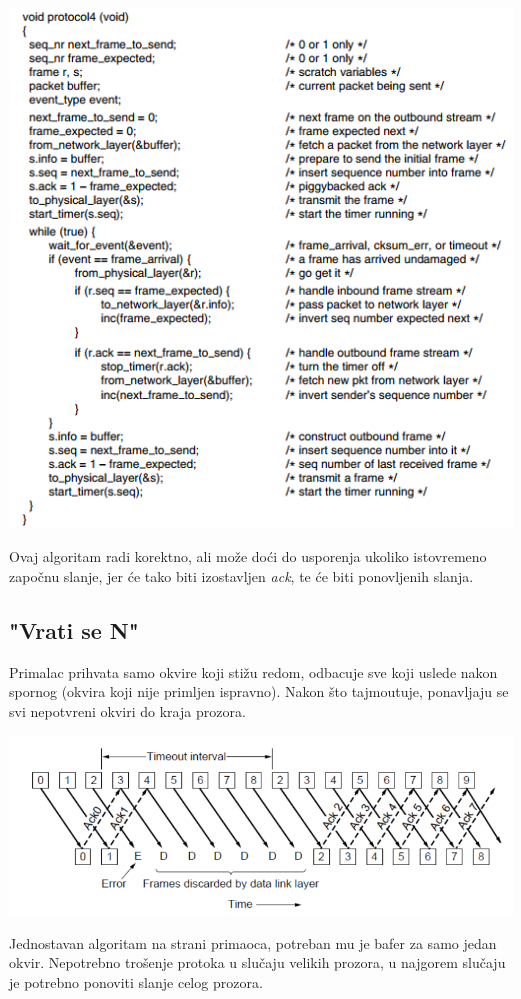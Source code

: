 \documentclass{article} %
\begin{document}
\begin{center}
\includegraphics[scale=0.7]{1-bitni-kod}
\end{center}
Ovaj algoritam radi korektno, ali mo\v{z}e do\'{c}i do usporenja ukoliko istovremeno zapo\v{c}nu slanje, jer \'{c}e tako biti izostavljen \textit{ack}, te \'{c}e biti ponovljenih slanja.

\subsection{"Vrati se N"}

Primalac prihvata samo okvire koji sti\v{z}u redom, odbacuje sve koji uslede nakon spornog (okvira koji nije primljen ispravno). Nakon \v{s}to tajmoutuje, ponavljaju se svi nepotvr\dj{}eni okviri do kraja prozora.

\begin{center}
\includegraphics[scale=0.4]{vrati-n}
\end{center}
Jednostavan algoritam na strani primaoca, potreban mu je bafer za samo jedan okvir. Nepotrebno tro\v{s}enje protoka u slu\v{c}aju velikih prozora, u najgorem slu\v{c}aju je potrebno ponoviti slanje celog prozora.
\end{document}
